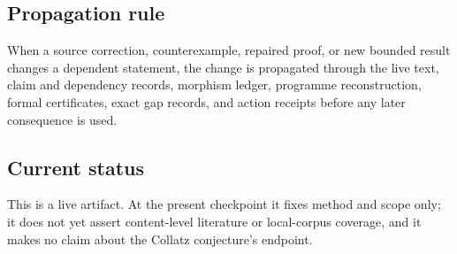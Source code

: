 \subsection{Propagation rule}

When a source correction, counterexample, repaired proof, or new bounded result
changes a dependent statement, the change is propagated through the live
text, claim and dependency records, morphism ledger, programme reconstruction,
formal certificates, exact gap records, and action receipts before any later
consequence is used.

\subsection{Current status}

This is a live artifact.  At the present checkpoint it fixes method and scope
only; it does not yet assert content-level literature or local-corpus coverage,
and it makes no claim about the Collatz conjecture's endpoint.

